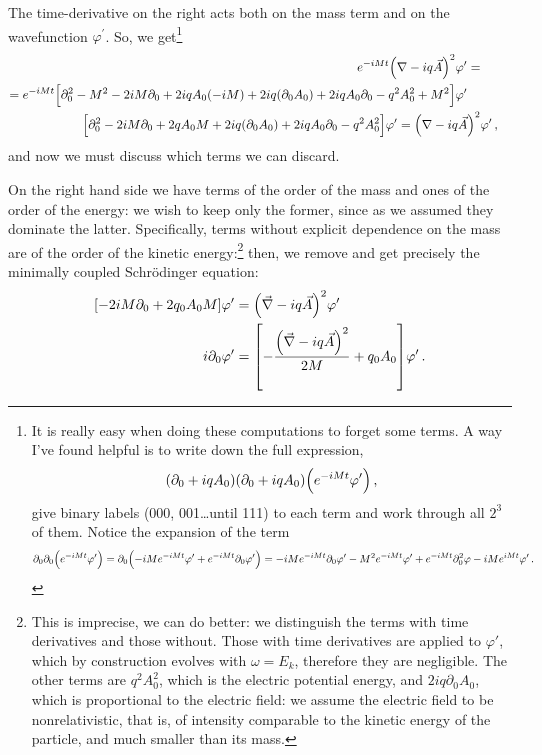 \documentclass[main.tex]{subfiles}
\begin{document}
The time-derivative on the right acts both on the mass term and on the wavefunction \(\varphi^{\prime }\). So, we get\footnote{It is really easy when doing these computations to forget some terms. A way I've found helpful is to write down the full expression, 
%
\begin{align}
\qty(\partial_0 + i q A_0 )
\qty(\partial_0 + i q A_0 )
\qty(e^{-iMt} \varphi')
\,,
\end{align}
%
give binary labels (000, 001\dots until 111) to each term and work through all \(2^3\) of them. Notice the expansion of the term 
%
\begin{align}
\partial_0 \partial_0 \qty(e^{-iMt} \varphi')
= \partial_0 \qty(-iM e^{-iMt} \varphi' + e^{-iMt} \partial_0 \varphi')
= -iM e^{-iMt} \partial_0 \varphi' 
- M^2 e^{-iMt} \varphi' 
+ e^{-iMt} \partial_0^2 \varphi 
- iM e^{iMt} \varphi' 
\,.
\end{align}
}
%
\begin{subequations}
\begin{align}
\begin{split}
e^{-iMt} \qty(\nabla- iq \vec{A})^2 &\varphi^{\prime } = \\
=e^{-iMt}
\qty[\partial_0^2 - M^2 - 2iM \partial_0  + 2iq A_0 (-iM) + 2 iq \qty(\partial_0 A_0 ) + 2iq A_0 \partial_0 - q^2 A_0^2 + M^2] & \varphi^{\prime }  
\end{split}
\\ 
\qty[\partial_0^2 - 2iM \partial_0  + 2q A_0 M + 2 iq \qty(\partial_0 A_0 ) + 2iq A_0 \partial_0 - q^2 A_0^2 ]
\varphi^{\prime }
=  
\qty(\nabla- iq \vec{A})^2  &\varphi^{\prime }
\,,
\end{align}
\end{subequations}
%
and now we must discuss which terms we can discard. 

On the right hand side we have terms of the order of the mass and ones of the order of the energy: we wish to keep only the former, since as we assumed they dominate the latter. Specifically, terms without explicit dependence on the mass are of the order of the kinetic energy:\footnote{This is imprecise, we can do better: we distinguish the terms with time derivatives and those without. 
Those with time derivatives are applied to \(\varphi'\), which by construction evolves with \(\omega = E_k\), therefore they are negligible. 
The other terms are \(q^2 A_0^2\), which is the electric potential energy, and  \(2iq \partial_0 A_0 \), which is proportional to the electric field: we assume the electric field to be nonrelativistic, that is, of intensity comparable to the kinetic energy of the particle, and much smaller than its mass.  
}
then, we remove and get precisely the minimally coupled Schrödinger equation:
%
\begin{subequations}
\begin{align}
\qty[- 2 iM \partial_0 + 2 q_0 A_0 M ] \varphi' &= \qty(\vec{\nabla} - iq \vec{A})^2 \varphi^{\prime }  \\
i \partial_0 \varphi' &= \qty[- \frac{ \qty(\vec{\nabla} - i q \vec{A})^2}{2M} + q_0 A_0 ] \varphi'
\,.
\end{align}
\end{subequations}
%
\end{document}
